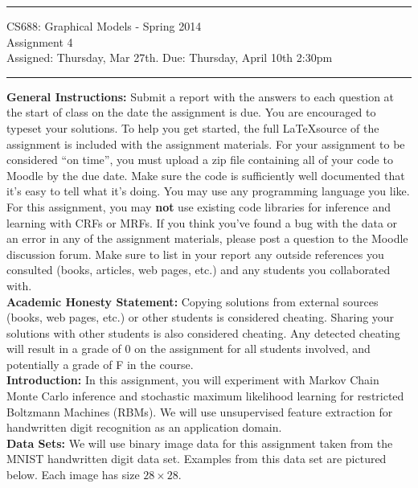 \documentclass[11pt]{article}
\begin{document}
{\centering
  \rule{6.3in}{2pt}
  \vspace{1em}
  \Large{
    CS688: Graphical Models - Spring 2014\\
    Assignment 4\\
  }
  \vspace{1em}
  Assigned: Thursday, Mar 27th. Due: Thursday, April 10th 2:30pm\\
  \vspace{0.1em}
  \rule{6.3in}{1.5pt}
}
\vspace{1pc}

\textbf{General Instructions:} Submit a report with the answers to each question at the start of class on the date the assignment is due. You are encouraged to typeset your solutions. To help you get started, the full \LaTeX source of the assignment is included with the assignment materials. For your assignment to be considered ``on time'', you must upload a zip file containing all of your code to Moodle by the due date. Make sure the code is sufficiently well documented that it's easy to tell what it's doing. You may use any programming language you like. For this assignment, you may \textbf{not} use existing code libraries for inference and learning with CRFs or MRFs. If you think you've found a bug with the data or an error in any of the assignment materials, please post a question to the Moodle discussion forum. Make sure to list in your report any outside references you consulted (books, articles, web pages, etc.) and any students you collaborated with.\\

\textbf{Academic Honesty Statement:} Copying solutions from external sources (books, web pages, etc.) or other students is considered cheating. Sharing your solutions with other students is also considered cheating. Any detected cheating will result in a grade of 0 on the assignment for all students involved, and potentially a grade of F in the course.\\

\textbf{Introduction:} In this assignment, you will experiment with Markov Chain Monte Carlo inference and stochastic maximum likelihood learning for restricted Boltzmann Machines (RBMs). We will use unsupervised feature extraction for handwritten digit recognition as an application domain.\\

\textbf{Data Sets:} We will use binary image data for this assignment taken from the MNIST handwritten digit data set. Examples from this data set are pictured below. Each image has size $28\times 28$.
\end{document}
